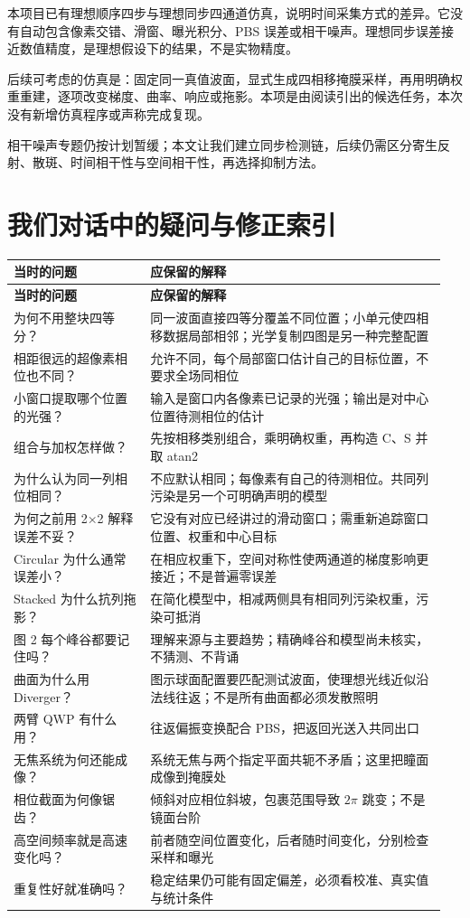 \documentclass[UTF8,fontset=fandol,11pt,a4paper]{ctexart}
\begin{document}
本项目已有理想顺序四步与理想同步四通道仿真，说明时间采集方式的差异。它没有自动包含像素交错、滑窗、曝光积分、PBS 误差或相干噪声。理想同步误差接近数值精度，是理想假设下的结果，不是实物精度。

后续可考虑的仿真是：固定同一真值波面，显式生成四相移掩膜采样，再用明确权重重建，逐项改变梯度、曲率、响应或拖影。本项是由阅读引出的候选任务，本次没有新增仿真程序或声称完成复现。

相干噪声专题仍按计划暂缓；本文让我们建立同步检测链，后续仍需区分寄生反射、散斑、时间相干性与空间相干性，再选择抑制方法。

\section{我们对话中的疑问与修正索引}

{\small
\begin{longtable}{>{\raggedright\arraybackslash}p{0.3\linewidth}>{\raggedright\arraybackslash}p{0.65\linewidth}}
\toprule
\textbf{当时的问题} & \textbf{应保留的解释} \\
\midrule
\endfirsthead
\toprule
\textbf{当时的问题} & \textbf{应保留的解释} \\
\midrule
\endhead
为何不用整块四等分？ & 同一波面直接四等分覆盖不同位置；小单元使四相移数据局部相邻；光学复制四图是另一种完整配置 \\
相距很远的超像素相位也不同？ & 允许不同，每个局部窗口估计自己的目标位置，不要求全场同相位 \\
小窗口提取哪个位置的光强？ & 输入是窗口内各像素已记录的光强；输出是对中心位置待测相位的估计 \\
组合与加权怎样做？ & 先按相移类别组合，乘明确权重，再构造 C、S 并取 atan2 \\
为什么认为同一列相位相同？ & 不应默认相同；每像素有自己的待测相位。共同列污染是另一个可明确声明的模型 \\
为何之前用 2×2 解释误差不妥？ & 它没有对应已经讲过的滑动窗口；需重新追踪窗口位置、权重和中心目标 \\
Circular 为什么通常误差小？ & 在相应权重下，空间对称性使两通道的梯度影响更接近；不是普遍零误差 \\
Stacked 为什么抗列拖影？ & 在简化模型中，相减两侧具有相同列污染权重，污染可抵消 \\
图 2 每个峰谷都要记住吗？ & 理解来源与主要趋势；精确峰谷和模型尚未核实，不猜测、不背诵 \\
曲面为什么用 Diverger？ & 图示球面配置要匹配测试波面，使理想光线近似沿法线往返；不是所有曲面都必须发散照明 \\
两臂 QWP 有什么用？ & 往返偏振变换配合 PBS，把返回光送入共同出口 \\
无焦系统为何还能成像？ & 系统无焦与两个指定平面共轭不矛盾；这里把瞳面成像到掩膜处 \\
相位截面为何像锯齿？ & 倾斜对应相位斜坡，包裹范围导致 \(2\pi\) 跳变；不是镜面台阶 \\
高空间频率就是高速变化吗？ & 前者随空间位置变化，后者随时间变化，分别检查采样和曝光 \\
重复性好就准确吗？ & 稳定结果仍可能有固定偏差，必须看校准、真实值与统计条件 \\
\bottomrule
\end{longtable}
}
\end{document}

